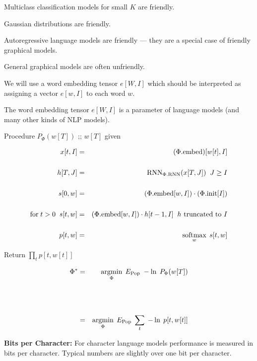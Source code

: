 {\vfill
Multiclass classification models for small $K$ are friendly.

\vfill
Gaussian distributions are friendly.

\vfill
Autoregressive language models are friendly --- they are a special case of friendly graphical models.

\vfill
General graphical models are often unfriendly.



We will use a word embedding tensor $e[W,I]$ which should be interpreted as assigning a vector $e[w,I]$ to each word $w$.

\vfill
The word embedding tensor $e[W,I]$ is a parameter of language models (and many other kinds of NLP models).


Procedure $P_\Phi(w[T])$ ;; {\color{red} $w[T]$ given}

\vfill
{\huge \begin{eqnarray*}
x[t,I] & = & (\Phi.\mathrm{embed})[w[t],I] \\
\\
h[T,J] & = & \mathrm{RNN}_{\Phi.\mathrm{RNN}}(x[T,J])\;\;J \geq I \\
\\
s[0,w] & = & (\Phi.\mathrm{embed}[w,I]) \cdot (\Phi.\mathrm{init}[I]) \\
\\
\mathrm{for}\;t > 0\;\;s[t,w] & = & (\Phi.\mathrm{embed}[w,I]) \cdot h[t-1,I] \;\;\mbox{$h$ truncated to $I$} \\
\\
p[t,w] & = & \operatorname*{softmax}_w\;s[t,w]
\end{eqnarray*}
}

\vfill
Return $\prod_t p[t,w[t]]$


\begin{eqnarray*}
\Phi^* &  = & \operatorname*{argmin}_\Phi\; E_{\mathrm{Pop}} \;-\ln\;P_\Phi(w[T]) \\
\\
\\
\\
& = & \operatorname*{argmin}_\Phi\;E_{\mathrm{Pop}}\;\sum_t\; -\ln\;p[t,w[t]]
\end{eqnarray*}


{\bf Bits per Character:}
For character language models performance is measured in bits per character.  Typical numbers are slightly over one bit per character.

}
